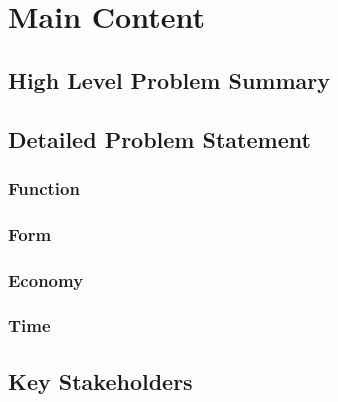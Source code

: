 \documentclass{article}
\begin{document}
\section{Main Content}
\subsection{High Level Problem Summary}
\subsection{Detailed Problem Statement}
\subsubsection{Function}
\subsubsection{Form}
\subsubsection{Economy}
\subsubsection{Time}
\subsection{Key Stakeholders}
 
\begin{thebibliography}{9}
\iffalse
\bibitem{latexcompanion} 
Michel Goossens, Frank Mittelbach, and Alexander Samarin. 
\textit{The \LaTeX\ Companion}. 
Addison-Wesley, Reading, Massachusetts, 1993.
 
\bibitem{einstein} 
Albert Einstein. 
\textit{Zur Elektrodynamik bewegter K{\"o}rper}. (German) 
[\textit{On the electrodynamics of moving bodies}]. 
Annalen der Physik, 322(10):891–921, 1905.
 
\bibitem{knuthwebsite} 
Knuth: Computers and Typesetting,
\\\texttt{http://www-cs-faculty.stanford.edu/\~{}uno/abcde.html}
\fi
\end{thebibliography}
 

 
\end{document}
